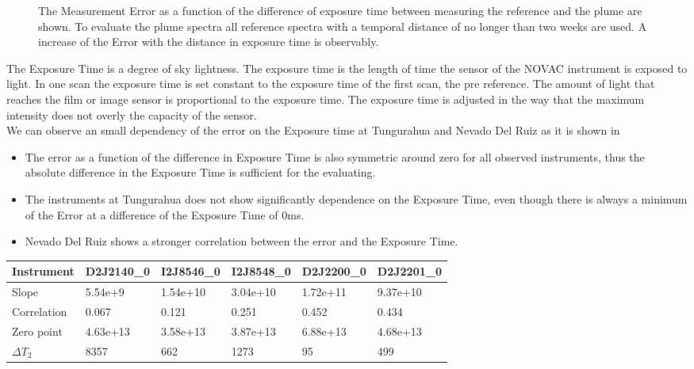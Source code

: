 \documentclass  [
  paper    = a4,
  BCOR     = 10mm,
  twoside,
  fontsize = 12pt,
  fleqn,
  toc      = bibnumbered,
  toc      = listofnumbered,
  numbers  = noendperiod,
  headings = normal,
  listof   = leveldown,
  version  = 3.03
]                                       {scrreprt}
\begin{document}
\begin{figure}
		\caption{The   Measurement Error as a function of the difference of exposure time between measuring the reference and the plume are shown. To evaluate the plume spectra all reference spectra with a temporal distance of no longer than two weeks are used. A increase of the   Error with the distance in exposure time is observably.}
		\label{fig:diffexptime}
	\end{figure}
	The Exposure Time is a degree of sky lightness. The  exposure time is the length of time the sensor of the NOVAC instrument is exposed to light. In one scan the exposure time is set constant to the exposure time of the first scan, the pre reference. The amount of light that reaches the film or image sensor is proportional to the exposure time. The exposure time is adjusted in the way that the maximum intensity does not overly the capacity of the sensor.\\
	We can observe an small dependency of the  error on the Exposure time at Tungurahua and Nevado Del Ruiz as it is shown in 
	\begin{itemize}
		\item The   error as a function of the difference in Exposure Time is also symmetric around zero for all observed instruments, thus the absolute difference in the Exposure Time is sufficient for the evaluating.
		\item The instruments at Tungurahua does not show significantly dependence on the Exposure Time, even though there is always a minimum of the   Error at a difference of the Exposure Time of 0ms.
		\item Nevado Del Ruiz shows a stronger correlation between the   error and the Exposure Time.
	\end{itemize}
	\begin{table}[h]
		\begin{tabular}{|p{2cm}|p{2cm}|p{2cm}|p{2cm}|p{2cm}|p{2cm}|}
			Instrument	&D2J2140\_0&I2J8546\_0& I2J8548\_0&D2J2200\_0&D2J2201\_0\\
			\toprule
			Slope& 5.54e+9&1.54e+10 &3.04e+10&1.72e+11&9.37e+10\\
			\midrule
			Correlation&0.067
			&0.121&
			0.251&
			0.452&
			0.434\\
			\midrule
			Zero point&4.63e+13&3.58e+13& 3.87e+13& 6.88e+13& 4.68e+13\\
						\midrule
			$\Delta T_{2}$&8357&662&1273&95&499\\
			\bottomrule
		\end{tabular}
		\label{tab:exptimecalc}
	\end{table}
\end{document}
